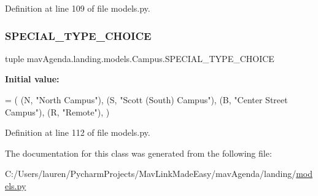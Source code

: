 Definition at line 109 of file models.\+py.

\mbox{\label{classmavAgenda_1_1landing_1_1models_1_1Campus_a195ab5d13273734c2c81094080bc6ee5}} 
\subsubsection{\texorpdfstring{S\+P\+E\+C\+I\+A\+L\+\_\+\+T\+Y\+P\+E\+\_\+\+C\+H\+O\+I\+CE}{SPECIAL\_TYPE\_CHOICE}}
{\footnotesize\ttfamily tuple mav\+Agenda.\+landing.\+models.\+Campus.\+S\+P\+E\+C\+I\+A\+L\+\_\+\+T\+Y\+P\+E\+\_\+\+C\+H\+O\+I\+CE\hspace{0.3cm}{\ttfamily [static]}}

{\bfseries Initial value\+:}
\begin{DoxyCode}
=  (
        (N, \textcolor{stringliteral}{"North Campus"}),
        (S, \textcolor{stringliteral}{"Scott (South) Campus"}),
        (B, \textcolor{stringliteral}{"Center Street Campus"}),
        (R, \textcolor{stringliteral}{"Remote"}),
    )
\end{DoxyCode}


Definition at line 112 of file models.\+py.



The documentation for this class was generated from the following file\+:\begin{DoxyCompactItemize}
\item 
C\+:/\+Users/lauren/\+Pycharm\+Projects/\+Mav\+Link\+Made\+Easy/mav\+Agenda/landing/\mbox{\hyperlink{models_8py}{models.\+py}}\end{DoxyCompactItemize}
